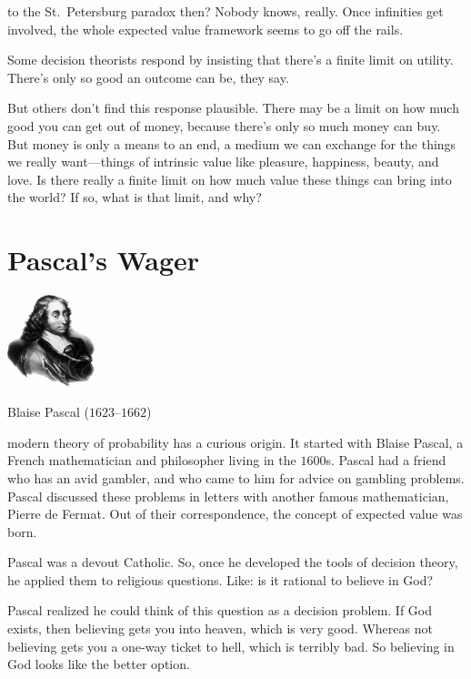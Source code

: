 \documentclass[justified]{tufte-book}
\theoremstyle{definition}
\theoremstyle{definition}
\theoremstyle{definition}
\theoremstyle{remark}
\begin{document}
 to the St.~Petersburg paradox
then? Nobody knows, really. Once infinities get involved, the whole
expected value framework seems to go off the rails.

Some decision theorists respond by insisting that there's a finite limit
on utility. There's only so good an outcome can be, they say.

But others don't find this response plausible. There may be a limit on
how much good you can get out of money, because there's only so much
money can buy. But money is only a means to an end, a medium we can
exchange for the things we really want---things of intrinsic value like
pleasure, happiness, beauty, and love. Is there really a finite limit on
how much value these things can bring into the world? If so, what is
that limit, and why?

\hypertarget{pascals-wager}{%
\section{Pascal's Wager}\label{pascals-wager}}

\begin{marginfigure}
\includegraphics[width=1in]{img/pascal} \caption[Blaise Pascal ($1623$--$1662$)]{Blaise Pascal ($1623$--$1662$)}\label{fig:unnamed-chunk-120}
\end{marginfigure}

 modern theory of probability has a curious origin. It
started with Blaise Pascal, a French mathematician and philosopher
living in the \(1600\)s. Pascal had a friend who has an avid gambler,
and who came to him for advice on gambling problems. Pascal discussed
these problems in letters with another famous mathematician, Pierre de
Fermat. Out of their correspondence, the concept of expected value was
born.

Pascal was a devout Catholic. So, once he developed the tools of
decision theory, he applied them to religious questions. Like: is it
rational to believe in God?

Pascal realized he could think of this question as a decision problem.
If God exists, then believing gets you into heaven, which is very good.
Whereas not believing gets you a one-way ticket to hell, which is
terribly bad. So believing in God looks like the better option.
\end{document}
